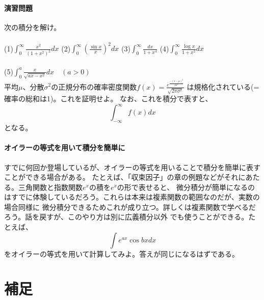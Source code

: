 \documentclass[a4j,dvipdfmx]{jsarticle}
\begin{document}
\subsection{演習問題}
次の積分を解け。\\\\
(1)$\displaystyle \int_0^\infty \frac{x^2}{(1+x^2)^2}dx$
\hspace{15mm}
(2)$\displaystyle \int_0^\infty \left(\frac{\sin x}{x}\right)^2 dx$
\hspace{15mm}
(3)$\displaystyle \int_0^\infty \frac{dx}{1+x^4}$
\hspace{15mm}
(4)$\displaystyle \int_0^\infty \frac{\log x}{1+x^2}dx$
\\\\
(5)$\displaystyle \int_0^a \frac{x}{\sqrt{ax-x^2}}dx\quad(a>0)$
\\

平均$\mu$、分散$\sigma^2$の正規分布の確率密度関数$\displaystyle f(x)=\frac{e^{\frac{-(x-\mu)^2}{2\sigma^2}}}{\sqrt{2\pi\sigma^2}}$ は規格化されている(=確率の総和は1)。これを証明せよ。
なお、これを積分で表すと、
\begin{equation*}
    \int_{-\infty}^{\infty}f(x)dx
\end{equation*}
となる。\\
\hrulefill
\subsection{オイラーの等式を用いて積分を簡単に}
\begin{screen}
    すでに何回か登場しているが、オイラーの等式を用いることで積分を簡単に表すことができる場合がある。
    たとえば、「収束因子」の章の例題などがそれにあたる。三角関数と指数関数$e^x$の積を$e^{x}$の形で表せると、
    微分積分が簡単になるのはすでに体験しているだろう。これらは本来は複素関数の範囲なのだが、実数の場合同様に
    微分積分できるためこれが成り立つ。詳しくは複素関数で学べるだろう。話を戻すが、このやり方は別に広義積分以外
    でも使うことができる。たとえば、
    \begin{equation*}
        \int e^{ax} \cos bxdx
    \end{equation*}
    をオイラーの等式を用いて計算してみよ。答えが同じになるはずである。
\end{screen}
\newpage
\part{補足}
\end{document}
